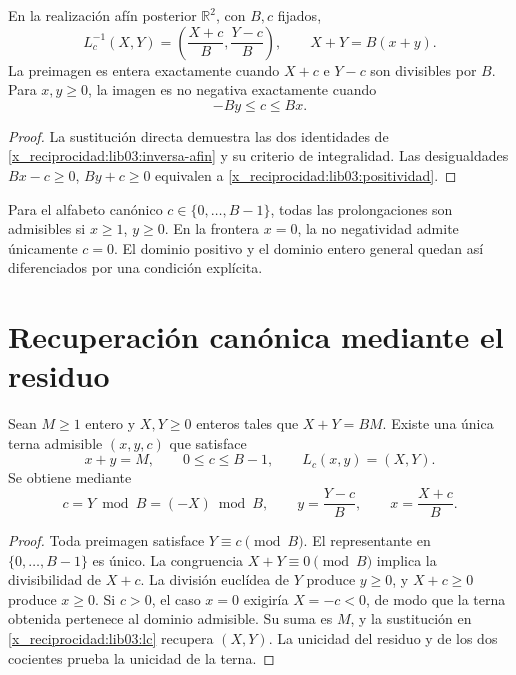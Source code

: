 \begin{proposition}
\label{x_reciprocidad:lib03:prop-inversa}
En la realización afín posterior \(\mathbb R^2\), con \(B,c\) fijados,
\begin{equation}
 L_c^{-1}(X,Y)=\left(\frac{X+c}{B},\frac{Y-c}{B}\right),\qquad
 X+Y=B(x+y).
 \label{x_reciprocidad:lib03:inversa-afin}
\end{equation}
La preimagen es entera exactamente cuando \(X+c\) e \(Y-c\) son
divisibles por \(B\). Para \(x,y\geq0\), la imagen es no negativa
exactamente cuando
\begin{equation}
 -By\leq c\leq Bx.
 \label{x_reciprocidad:lib03:positividad}
\end{equation}
\end{proposition}

\begin{proof}
La sustitución directa demuestra las dos identidades de
\eqref{x_reciprocidad:lib03:inversa-afin} y su criterio de integralidad. Las
desigualdades \(Bx-c\geq0\), \(By+c\geq0\) equivalen a
\eqref{x_reciprocidad:lib03:positividad}.
\end{proof}

Para el alfabeto canónico \(c\in\{0,\ldots,B-1\}\), todas las
prolongaciones son admisibles si \(x\geq1\), \(y\geq0\). En la
frontera \(x=0\), la no negatividad admite únicamente \(c=0\).
El dominio positivo y el dominio entero general quedan así
diferenciados por una condición explícita.

\section{Recuperación canónica mediante el residuo}
\label{x_reciprocidad:lib03:residuo}

\begin{theorem}
\label{x_reciprocidad:lib03:teo-residuo}
Sean \(M\geq1\) entero y \(X,Y\geq0\) enteros tales que
\(X+Y=BM\). Existe una única terna admisible \((x,y,c)\) que satisface
\[
 x+y=M,\qquad 0\leq c\leq B-1,\qquad L_c(x,y)=(X,Y).
\]
Se obtiene mediante
\begin{equation}
 c=Y\bmod B=(-X)\bmod B,\qquad
 y=\frac{Y-c}{B},\qquad x=\frac{X+c}{B}.
 \label{x_reciprocidad:lib03:residuo-inversor}
\end{equation}
\end{theorem}

\begin{proof}
Toda preimagen satisface \(Y\equiv c\pmod B\). El representante en
\(\{0,\ldots,B-1\}\) es único. La congruencia \(X+Y\equiv0\pmod B\)
implica la divisibilidad de \(X+c\). La división euclídea de \(Y\)
produce \(y\geq0\), y \(X+c\geq0\) produce \(x\geq0\). Si
\(c>0\), el caso \(x=0\) exigiría \(X=-c<0\), de modo que la
terna obtenida pertenece al dominio admisible. Su suma es \(M\), y
la sustitución en \eqref{x_reciprocidad:lib03:lc} recupera \((X,Y)\). La unicidad
del residuo y de los dos cocientes prueba la unicidad de la terna.
\end{proof}

